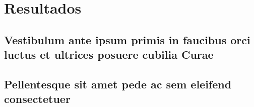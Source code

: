 
\chapter{Resultados}

\section{Vestibulum ante ipsum primis in faucibus orci luctus et ultrices
posuere cubilia Curae}

\lipsum[21-22]

\section{Pellentesque sit amet pede ac sem eleifend consectetuer}

\lipsum[24]
